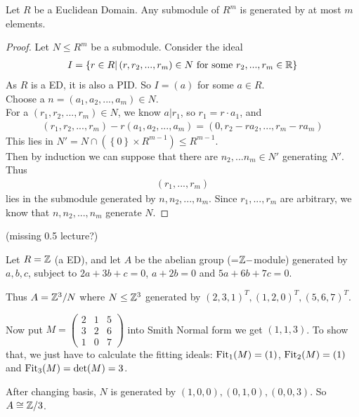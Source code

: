 \documentclass[a4paper]{article}
\begin{document}
\begin{lemma}
Let $R$ be a Euclidean Domain. Any submodule of $R^m$ is generated by at most $m$ elements.
\begin{proof}
Let $N\leq R^m$ be a submodule. Consider the ideal
\begin{equation*}
\begin{aligned}
I= \left\{ r \in R | \left(r, r_2, ..., r_m\right) \in N  \text{ for some  } r_2, ..., r_m \in \mathbb{R}\right\}
\end{aligned}
\end{equation*}
As $R$ is a ED, it is also a PID. So $I=\left(a\right)$ for some $a\in R$.\\
Choose a $n=\left(a_1, a_2, ..., a_m\right) \in N$.\\
For a $\left(r_1, r_2,..., r_m\right) \in N$, we know $a|r_1$, so $r_1 = r \cdot a_1$, and
\begin{equation*}
\begin{aligned}
\left(r_1, r_2, ..., r_m\right) - r\left(a_1, a_2, ..., a_m\right) = \left(0, r_2-ra_2, ..., r_m-ra_m\right)
\end{aligned}
\end{equation*}
This lies in $N' = N \cap \left(\left\{0\right\} \times R^{m-1}\right) \leq R^{m-1}$.\\
Then by induction we can suppose that there are $n_2, ... n_m \in N'$ generating $N'$. Thus
\begin{equation*}
\begin{aligned}
\left(r_1,...,r_m\right)
\end{aligned}
\end{equation*}
lies in the submodule generated by $n,n_2,...,n_m$. Since $r_1,...,r_m$ are arbitrary, we know that $n,n_2,...,n_m$ generate $N$.
\end{proof}
\end{lemma}

(missing 0.5 lecture?)

\begin{eg}
Let $R = \mathbb{Z}$ (a ED), and let $A$ be the abelian group (=$\mathbb{Z}-$module) generated by $a,b,c$, subject to $2a+3b+c=0$, $a+2b=0$ and $5a+6b+7c=0$.

Thus $A = \mathbb{Z}^3/N$ where $N \leq \mathbb{Z}^3$ generated by $(2,3,1)^T,(1,2,0)^T,(5,6,7)^T$.

Now put $M=\left(\begin{matrix}
2 & 1 & 5\\
3 & 2 & 6\\
1 & 0 & 7
\end{matrix}\right)$ into Smith Normal form we get $(1,1,3)$. To show that, we just have to calculate the fitting ideals: $\operatorname{Fit}_1(M) = (1)$, $\operatorname{Fit}_2(M)=(1)$ and $\operatorname{Fit}_3(M)=\det(M) = 3$.

After changing basis, $N$ is generated by $(1,0,0),(0,1,0),(0,0,3)$. So $A \cong \mathbb{Z}/3$.
\end{eg}
\end{document}
